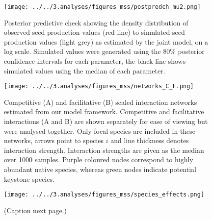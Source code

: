 \documentclass[a4,12pt]{article}
\begin{document}
    \begin{figure}[H]
        \texttt{[image: ../../3.analyses/figures\_mss/postpredch\_mu2.png]}
        \caption{Posterior predictive check showing the density distribution of observed seed production values (red line) to simulated seed production values (light grey) as estimated by the joint model, on a log scale. Simulated values were generated using the 80\% posterior confidence intervals for each parameter, the black line shows simulated values using the median of each parameter. }
        \label{fig:ppcheckmu2}
    \end{figure}

    \begin{figure}[H]
        \begin{centering}
        \texttt{[image: ../../3.analyses/figures\_mss/networks\_C\_F.png]}
        \caption{Competitive (A) and facilitative (B) scaled interaction networks estimated from our model framework. Competitive and facilitative interactions (A and B) are shown separately for ease of viewing but were analysed together. Only focal species are included in these networks, arrows point to species $i$ and line thickness denotes interaction strength. Interaction strengths are given as the median over 1000 samples. Purple coloured nodes correspond to highly abundant native species, whereas green nodes indicate potential keystone species.}
        \label{fig:netwks}
       \end{centering}
    \end{figure}  


    \begin{figure}[H]
        \begin{centering}
        \texttt{[image: ../../3.analyses/figures\_mss/species\_effects.png]}
        \caption{(Caption next page.)}
        \label{fig:species}
        \end{centering}
    \end{figure} 
\end{document}
